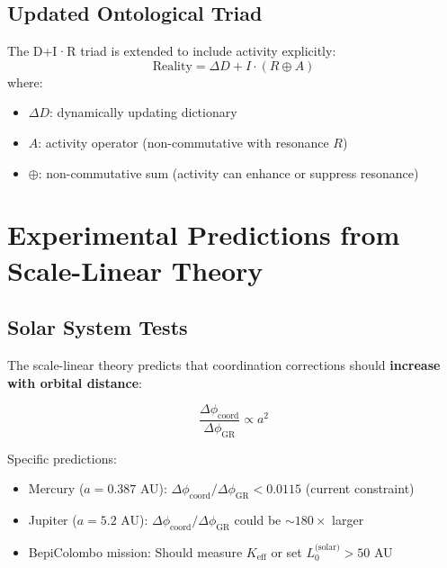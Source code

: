 \documentclass[11pt,a4paper]{article}
\begin{document}
\subsection{Updated Ontological Triad}

The D+I·R triad is extended to include activity explicitly:
\[
\boxed{\mathrm{Reality} = \Delta D + I \cdot (R \oplus A)}
\]
where:
\begin{itemize}
	\item $\Delta D$: dynamically updating dictionary
	\item $A$: activity operator (non-commutative with resonance $R$)
	\item $\oplus$: non-commutative sum (activity can enhance or suppress resonance)
\end{itemize}


\section{Experimental Predictions from Scale-Linear Theory}
\label{sec:scale-predictions}

\subsection{Solar System Tests}

The scale-linear theory predicts that coordination corrections should 
\textbf{increase with orbital distance}:

\begin{equation}
	\frac{\Delta\phi_{\text{coord}}}{\Delta\phi_{\text{GR}}} \propto a^2
\end{equation}

Specific predictions:
\begin{itemize}
	\item Mercury ($a = 0.387$ AU): $\Delta\phi_{\text{coord}}/\Delta\phi_{\text{GR}} < 0.0115$ (current constraint)
	\item Jupiter ($a = 5.2$ AU): $\Delta\phi_{\text{coord}}/\Delta\phi_{\text{GR}}$ could be $\sim 180\times$ larger
	\item BepiColombo mission: Should measure $K_{\mathrm{eff}}$ or set $L_0^{\text{(solar)}} > 50$ AU
\end{itemize}
\end{document}
